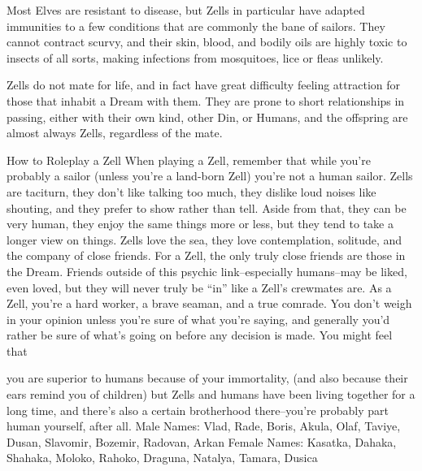 \documentclass[oneside,11pt,english]{book}
\begin{document}
 

Most Elves are resistant to disease, but Zells in particular have adapted immunities to a few conditions 
that are commonly the bane of sailors. They cannot contract scurvy, and their skin, blood, and bodily oils 
are highly toxic to insects of all sorts, making infections from mosquitoes, lice or fleas unlikely. 

 

Zells do not mate for life, and in fact have great difficulty feeling attraction for those that inhabit a Dream 
with them. They are prone to short relationships in passing, either with their own kind, other Din, or 
Humans, and the offspring are almost always Zells, regardless of the mate. 

 

How to Roleplay a Zell 
When playing a Zell, remember that while you’re probably a sailor (unless you’re a land-born Zell) 
you’re not a human sailor. Zells are taciturn, they don’t like talking too much, they dislike loud noises 
like shouting, and they prefer to show rather than tell. Aside from that, they can be very human, they 
enjoy the same things more or less, but they tend to take a longer view on things. Zells love the sea, they 
love contemplation, solitude, and the company of close friends. For a Zell, the only truly close friends are 
those in the Dream. Friends outside of this psychic link--especially humans--may be liked, even loved, 
but they will never truly be “in” like a Zell’s crewmates are. As a Zell, you’re a hard worker, a brave 
seaman, and a true comrade. You don’t weigh in your opinion unless you’re sure of what you’re saying, 
and generally you’d rather be sure of what’s going on before any decision is made. You might feel that 


you are superior to humans because of your immortality, (and also because their ears remind you of 
children) but Zells and humans have been living together for a long time, and there’s also a certain 
brotherhood there--you’re probably part human yourself, after all. 
Male Names: Vlad, Rade, Boris, Akula, Olaf, Taviye, Dusan, Slavomir, Bozemir, Radovan, Arkan 
Female Names: Kasatka, Dahaka, Shahaka, Moloko, Rahoko, Draguna, Natalya, Tamara, Dusica 
 
\end{document}
